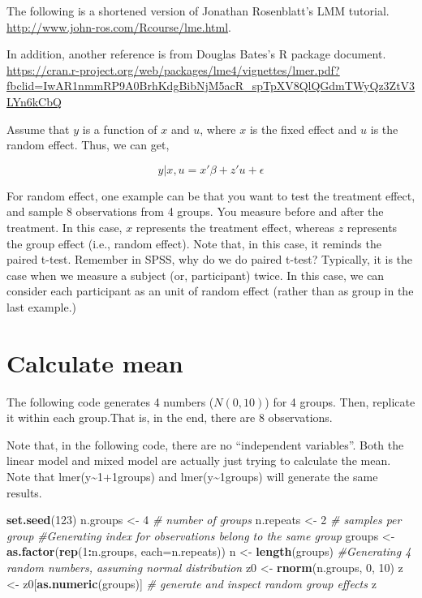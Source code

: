\documentclass[]{book}
\newenvironment{Shaded}{\begin{snugshade}}{\end{snugshade}}
\newcommand{\CommentTok}[1]{\textcolor[rgb]{0.56,0.35,0.01}{\textit{#1}}}
\newcommand{\DataTypeTok}[1]{\textcolor[rgb]{0.13,0.29,0.53}{#1}}
\newcommand{\DecValTok}[1]{\textcolor[rgb]{0.00,0.00,0.81}{#1}}
\newcommand{\KeywordTok}[1]{\textcolor[rgb]{0.13,0.29,0.53}{\textbf{#1}}}
\newcommand{\NormalTok}[1]{#1}
\newcommand{\OperatorTok}[1]{\textcolor[rgb]{0.81,0.36,0.00}{\textbf{#1}}}
\newcommand{\StringTok}[1]{\textcolor[rgb]{0.31,0.60,0.02}{#1}}
\begin{document}
The following is a shortened version of Jonathan Rosenblatt's LMM tutorial. \url{http://www.john-ros.com/Rcourse/lme.html}.

In addition, another reference is from Douglas Bates's R package document.
\url{https://cran.r-project.org/web/packages/lme4/vignettes/lmer.pdf?fbclid=IwAR1nmmRP9A0BrhKdgBibNjM5acR_spTpXV8QlQGdmTWyQz3ZtV3LYn6kCbQ}

Assume that \(y\) is a function of \(x\) and \(u\), where \(x\) is the fixed effect and \(u\) is the random effect. Thus, we can get,

\[y|x, u = x'\beta+z'u+\epsilon\]

For random effect, one example can be that you want to test the treatment effect, and sample 8 observations from 4 groups. You measure before and after the treatment. In this case, \(x\) represents the treatment effect, whereas \(z\) represents the group effect (i.e., random effect). Note that, in this case, it reminds the paired t-test. Remember in SPSS, why do we do paired t-test? Typically, it is the case when we measure a subject (or, participant) twice. In this case, we can consider each participant as an unit of random effect (rather than as group in the last example.)

\hypertarget{calculate-mean}{%
\section{Calculate mean}\label{calculate-mean}}

The following code generates 4 numbers (\(N(0,10)\)) for 4 groups. Then, replicate it within each group.That is, in the end, there are 8 observations.

Note that, in the following code, there are no ``independent variables''. Both the linear model and mixed model are actually just trying to calculate the mean. Note that lmer(y\textasciitilde{}1+1\textbar{}groups) and lmer(y\textasciitilde{}1\textbar{}groups) will generate the same results.

\begin{Shaded}
\begin{Highlighting}[]
\KeywordTok{set.seed}\NormalTok{(}\DecValTok{123}\NormalTok{)}
\NormalTok{n.groups <-}\StringTok{ }\DecValTok{4} \CommentTok{# number of groups}
\NormalTok{n.repeats <-}\StringTok{ }\DecValTok{2} \CommentTok{# samples per group}
\CommentTok{#Generating index for observations belong to the same group}
\NormalTok{groups <-}\StringTok{ }\KeywordTok{as.factor}\NormalTok{(}\KeywordTok{rep}\NormalTok{(}\DecValTok{1}\OperatorTok{:}\NormalTok{n.groups, }\DataTypeTok{each=}\NormalTok{n.repeats))}
\NormalTok{n <-}\StringTok{ }\KeywordTok{length}\NormalTok{(groups)}
\CommentTok{#Generating 4 random numbers, assuming normal distribution}
\NormalTok{z0 <-}\StringTok{ }\KeywordTok{rnorm}\NormalTok{(n.groups, }\DecValTok{0}\NormalTok{, }\DecValTok{10}\NormalTok{) }
\NormalTok{z <-}\StringTok{ }\NormalTok{z0[}\KeywordTok{as.numeric}\NormalTok{(groups)] }\CommentTok{# generate and inspect random group effects}
\NormalTok{z}
\end{Highlighting}
\end{Shaded}
\end{document}
